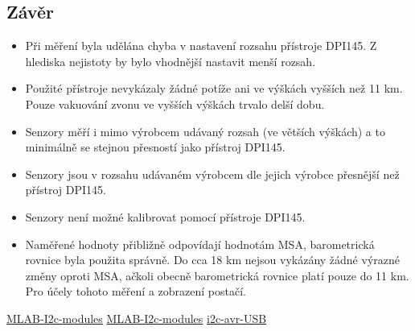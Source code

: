 \documentclass[12pt,a4paper,oneside]{article}
\begin{document}
\subsection{Závěr}

\begin{itemize}
\item Při měření byla udělána chyba v nastavení rozsahu přístroje DPI145. Z hlediska nejistoty by bylo vhodnější nastavit menší rozsah.
\item Použité přístroje nevykázaly žádné potíže ani ve výškách vyšších než 11 km. Pouze vakuování zvonu ve vyšších výškách trvalo delší dobu.
\item Senzory měří i mimo výrobcem udávaný rozsah (ve větších výškách) a to minimálně se stejnou přesností jako přístroj DPI145.
\item Senzory jsou v rozsahu udávaném výrobcem dle jejich výrobce přesnější než přístroj DPI145.
\item Senzory není možné kalibrovat pomocí přístroje DPI145.
\item Naměřené hodnoty přibližně odpovídají hodnotám MSA, barometrická rovnice byla použita správně. Do cca 18 km nejsou vykázány žádné výrazné změny oproti MSA, ačkoli obecně barometrická rovnice platí pouze do 11 km. Pro účely tohoto měření a zobrazení postačí.
\end{itemize}



\begin{thebibliography}{99}
\href{https://github.com/MLAB-project/MLAB-I2c-modules}{MLAB-I2c-modules}
\href{svn://svn.mlab.cz/mlab/Modules/Sensors/ALTIMET01A/SW/Python}{MLAB-I2c-modules}
\href{http://wiki.mlab.cz/doku.php?id=cs:i2c_avr_usb}{i2c-avr-USB}
\end{thebibliography}
\end{document}
